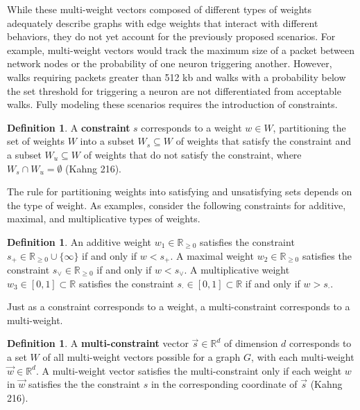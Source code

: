 \documentclass[12pt]{amsart}
\theoremstyle{definition}
\newtheorem{definition}[thm]{Definition}
\theoremstyle{remark}
\numberwithin{equation}{section}
\newcommand{\R}{\mathbb{R}}
\begin{document}
While these multi-weight vectors composed of different types of weights adequately describe graphs with edge weights that interact with different behaviors, they do not yet account for the previously proposed scenarios. For example, multi-weight vectors would track the maximum size of a packet between network nodes or the probability of one neuron triggering another. However, walks requiring packets greater than 512 kb and walks with a probability below the set threshold for triggering a neuron are not differentiated from acceptable walks. Fully modeling these scenarios requires the introduction of constraints.

\begin{definition}
A \textbf{constraint} $s$ corresponds to a weight $w \in W$, partitioning the set of weights $W$ into a subset $W_s \subseteq W$ of weights that satisfy the constraint and a subset $W_u \subseteq W$ of weights that do not satisfy the constraint, where $W_s \cap W_u = \emptyset$ (Kahng 216).
\end{definition}

The rule for partitioning weights into satisfying and unsatisfying sets depends on the type of weight. As examples, consider the following constraints for additive, maximal, and multiplicative types of weights.

\begin{definition}
An additive weight $w_1 \in \R_{\ge 0}$ satisfies the constraint $s_+ \in \R_{\ge 0} \cup \{\infty\}$ if and only if $w < s_+$. A maximal weight $w_2 \in \R_{\ge 0}$ satisfies the constraint $s_{\vee} \in \R_{\ge 0}$ if and only if $w < s_{\vee}$. A multiplicative weight $w_3 \in [0,1] \subset \R$ satisfies the constraint $s_{\cdot} \in [0,1] \subset \R$ if and only if $w > s_{\cdot}$.
\end{definition}

Just as a constraint corresponds to a weight, a multi-constraint corresponds to a multi-weight.

\begin{definition}
A \textbf{multi-constraint} vector $\vec{s} \in \R^d$ of dimension $d$ corresponds to a set $W$ of all multi-weight vectors possible for a graph $G$, with each multi-weight $\vec{w} \in \R^d$. A multi-weight vector satisfies the multi-constraint only if each weight $w$ in $\vec{w}$ satisfies the the constraint $s$ in the corresponding coordinate of $\vec{s}$ (Kahng 216).
\end{definition}
\end{document}
